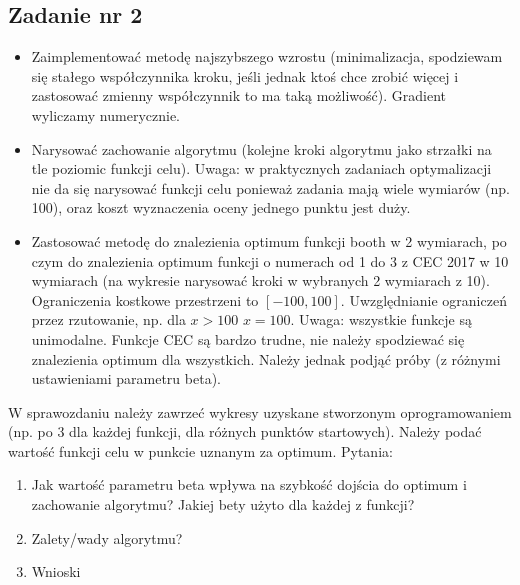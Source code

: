     \subsection{Zadanie nr 2}
    \begin{itemize}
    	
      \item Zaimplementować metodę najszybszego wzrostu (minimalizacja, 
        spodziewam się stałego współczynnika kroku, jeśli jednak ktoś chce zrobić
        więcej i zastosować zmienny współczynnik to ma taką możliwość). Gradient
        wyliczamy numerycznie.

      \item Narysować zachowanie algorytmu (kolejne kroki algorytmu jako strzałki
        na tle poziomic funkcji celu). Uwaga: w praktycznych zadaniach
        optymalizacji nie da się narysować funkcji celu ponieważ zadania mają
        wiele wymiarów (np. 100), oraz koszt wyznaczenia oceny jednego punktu
        jest duży.
      \item Zastosować metodę do znalezienia optimum funkcji booth w 2 wymiarach,
        po czym do znalezienia optimum funkcji o numerach od 1 do 3 z CEC 2017 w
        10 wymiarach (na wykresie narysować kroki w wybranych 2 wymiarach z 10).
        Ograniczenia kostkowe przestrzeni to $[-100, 100]$. Uwzględnianie 
        ograniczeń przez rzutowanie, np. dla $x>100$ $x=100$. Uwaga: wszystkie
        funkcje są unimodalne. Funkcje CEC są bardzo trudne, nie należy
        spodziewać się znalezienia optimum dla wszystkich. Należy jednak podjąć
        próby (z różnymi ustawieniami parametru beta).
    \end{itemize}

    W sprawozdaniu należy zawrzeć wykresy uzyskane stworzonym oprogramowaniem 
    (np. po 3 dla każdej funkcji, dla różnych punktów startowych). Należy podać 
    wartość funkcji celu w punkcie uznanym za optimum.
    Pytania:

    \begin{enumerate}
      \item Jak wartość parametru beta wpływa na szybkość dojścia do optimum i 
        zachowanie algorytmu? Jakiej bety użyto dla każdej z funkcji?
      \item Zalety/wady algorytmu?
      \item Wnioski
    \end{enumerate}

